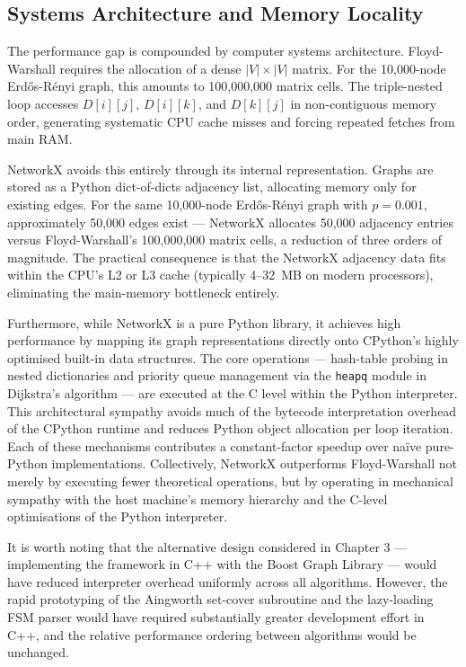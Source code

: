 \subsection{Systems Architecture and Memory Locality}

The performance gap is compounded by computer systems architecture. Floyd-Warshall requires the allocation of a dense $|V| \times |V|$ matrix. For the 10,000-node Erdős-Rényi graph, this amounts to 100,000,000 matrix cells. The triple-nested loop accesses $D[i][j]$, $D[i][k]$, and $D[k][j]$ in non-contiguous memory order, generating systematic CPU cache misses and forcing repeated fetches from main RAM.

NetworkX avoids this entirely through its internal representation. Graphs are stored as a Python dict-of-dicts adjacency list, allocating memory only for existing edges. For the same 10,000-node Erdős-Rényi graph with $p = 0.001$, approximately 50,000 edges exist --- NetworkX allocates 50,000 adjacency entries versus Floyd-Warshall's 100,000,000 matrix cells, a reduction of three orders of magnitude. The practical consequence is that the NetworkX adjacency data fits within the CPU's L2 or L3 cache (typically 4--32~MB on modern processors), eliminating the main-memory bottleneck entirely.

Furthermore, while NetworkX is a pure Python library, it achieves high performance by mapping its graph representations directly onto CPython's highly optimised built-in data structures. The core operations --- hash-table probing in nested dictionaries and priority queue management via the \texttt{heapq} module in Dijkstra's algorithm --- are executed at the C level within the Python interpreter. This architectural sympathy avoids much of the bytecode interpretation overhead of the CPython runtime and reduces Python object allocation per loop iteration. Each of these mechanisms contributes a constant-factor speedup over naïve pure-Python implementations. Collectively, NetworkX outperforms Floyd-Warshall not merely by executing fewer theoretical operations, but by operating in mechanical sympathy with the host machine's memory hierarchy and the C-level optimisations of the Python interpreter.

It is worth noting that the alternative design considered in Chapter 3 --- implementing the framework in C++ with the Boost Graph Library --- would have reduced interpreter overhead uniformly across all algorithms. However, the rapid prototyping of the Aingworth set-cover subroutine and the lazy-loading FSM parser would have required substantially greater development effort in C++, and the relative performance ordering between algorithms would be unchanged.


